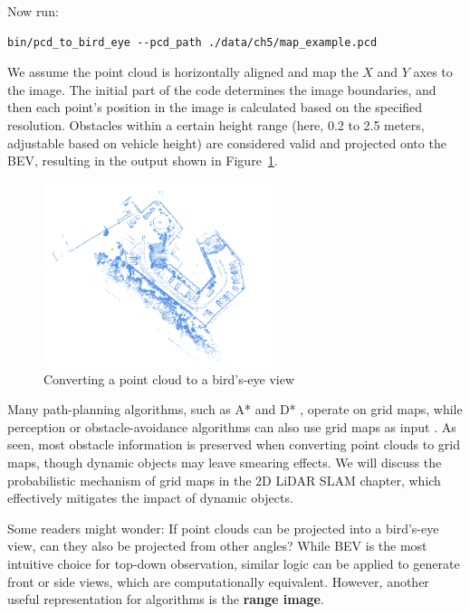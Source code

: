 Now run:  
\begin{lstlisting}[caption=Terminal input:]  
bin/pcd_to_bird_eye --pcd_path ./data/ch5/map_example.pcd  
\end{lstlisting}  

We assume the point cloud is horizontally aligned and map the $X$ and $Y$ axes to the image. The initial part of the code determines the image boundaries, and then each point's position in the image is calculated based on the specified resolution. Obstacles within a certain height range (here, 0.2 to 2.5 meters, adjustable based on vehicle height) are considered valid and projected onto the BEV, resulting in the output shown in Figure~\ref{fig:bev-example}.  

\begin{figure}[!htp]  
	\centering  
	\includegraphics[width=0.6\textwidth]{resources/basic-point-cloud/bev.pdf}  
	\caption{Converting a point cloud to a bird's-eye view}  
	\label{fig:bev-example}  
\end{figure}  

Many path-planning algorithms, such as A* and D* \cite{Delling2009}, operate on grid maps, while perception or obstacle-avoidance algorithms can also use grid maps as input \cite{Sabe2004}. As seen, most obstacle information is preserved when converting point clouds to grid maps, though dynamic objects may leave smearing effects. We will discuss the probabilistic mechanism of grid maps in the 2D LiDAR SLAM chapter, which effectively mitigates the impact of dynamic objects.  

Some readers might wonder: If point clouds can be projected into a bird's-eye view, can they also be projected from other angles? While BEV is the most intuitive choice for top-down observation, similar logic can be applied to generate front or side views, which are computationally equivalent. However, another useful representation for algorithms is the \textbf{range image}.  

